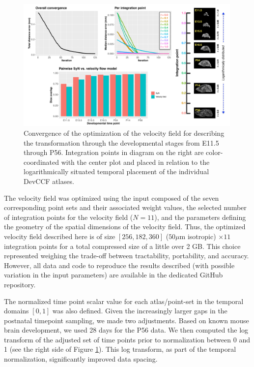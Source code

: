 \documentclass[
  12pt,
]{article}
\begin{document}
\begin{figure}[!htb]
\centering
\includegraphics[width=0.99\textwidth]{Figures/convergence.pdf}
\caption{Convergence of the optimization of the velocity field for describing
the transformation through the developmental stages from E11.5 through P56.
Integration points in diagram on the right are color-coordinated with the center
plot and placed in relation to the logarithmically situated temporal placement
of the individual DevCCF atlases.}
\label{fig:convergence}
\end{figure}

The velocity field was optimized using the input composed of the seven
corresponding point sets and their associated weight values, the
selected number of integration points for the velocity field (\(N=11\)),
and the parameters defining the geometry of the spatial dimensions of
the velocity field. Thus, the optimized velocity field described here is
of size \([256, 182, 360]\) (\(50
\mu\)m isotropic) \(\times 11\) integration points for a total
compressed size of a little over 2 GB. This choice represented weighing
the trade-off between tractability, portability, and accuracy. However,
all data and code to reproduce the results described (with possible
variation in the input parameters) are available in the dedicated GitHub
repository.

The normalized time point scalar value for each atlas/point-set in the
temporal domains \([0, 1]\) was also defined. Given the increasingly
larger gaps in the postnatal timepoint sampling, we made two
adjustments. Based on known mouse brain development, we used 28 days for
the P56 data. We then computed the log transform of the adjusted set of
time points prior to normalization between 0 and 1 (see the right side
of Figure \ref{fig:convergence}). This log transform, as part of the
temporal normalization, significantly improved data spacing.
\end{document}
